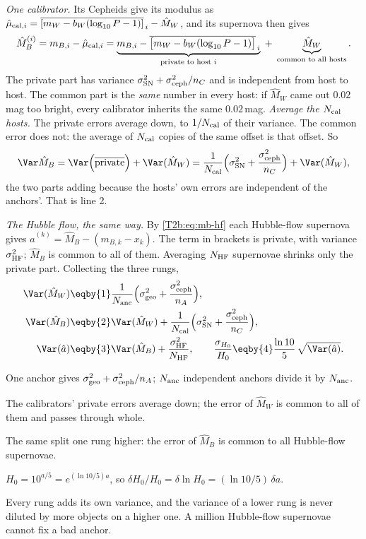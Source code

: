 \emph{One calibrator.} Its Cepheids give its modulus as $\hat\mu_{{\rm cal},i}=\overline{[m_W-b_W(\log_{10}P-1)]}_{\,i}-\hat M_W$, and its supernova then gives
\[
  \hat M_B^{(i)}=m_{B,i}-\hat\mu_{{\rm cal},i}
  =\underbrace{m_{B,i}-\overline{\big[m_W-b_W(\log_{10}P-1)\big]}_{\,i}}_{\text{private to host }i}
  \;+\;\underbrace{\hat M_W}_{\text{common to all hosts}} .
\]
The private part has variance $\sigma_{\rm SN}^2+\sigma_{\rm ceph}^2/n_C$ and is independent from host to host. The common part is the \emph{same} number in every host: if $\hat M_W$ came out $0.02$\,mag too bright, every calibrator inherits the same $0.02$\,mag. \emph{Average the $N_{\rm cal}$ hosts.} The private errors average down, to $1/N_{\rm cal}$ of their variance. The common error does not: the average of $N_{\rm cal}$ copies of the same offset is that offset. So
\[
  \Var\hat M_B=\Var\Big(\overline{\text{private}}\Big)+\Var(\hat M_W)
  =\frac{1}{N_{\rm cal}}\Big(\sigma_{\rm SN}^2+\frac{\sigma_{\rm ceph}^2}{n_C}\Big)+\Var(\hat M_W),
\]
the two parts adding because the hosts' own errors are independent of the anchors'. That is line 2.

\emph{The Hubble flow, the same way.} By \eqref{T2b:eq:mb-hf} each Hubble-flow supernova gives $\hat a^{(k)}=\hat M_B-(m_{B,k}-x_k)$. The term in brackets is private, with variance $\sigma_{\rm HF}^2$; $\hat M_B$ is common to all of them. Averaging $N_{\rm HF}$ supernovae shrinks only the private part. Collecting the three rungs,
\begin{align}
  \Var(\hat M_W)&\eqby{1}\frac{1}{N_{\rm anc}}\Big(\sigma_{\rm geo}^2+\frac{\sigma_{\rm ceph}^2}{n_A}\Big),\nonumber\\
  \Var(\hat M_B)&\eqby{2}\Var(\hat M_W)+\frac{1}{N_{\rm cal}}\Big(\sigma_{\rm SN}^2+\frac{\sigma_{\rm ceph}^2}{n_C}\Big),\nonumber\\
  \Var(\hat a)&\eqby{3}\Var(\hat M_B)+\frac{\sigma_{\rm HF}^2}{N_{\rm HF}},\qquad
  \frac{\sigma_{H_0}}{H_0}\eqby{4}\frac{\ln10}{5}\,\sqrt{\Var(\hat a)} .
  \label{T2b:eq:ladder-budget}
\end{align}
\begin{explain}
  \item One anchor gives $\sigma_{\rm geo}^2+\sigma_{\rm ceph}^2/n_A$; $N_{\rm anc}$ independent anchors divide it by $N_{\rm anc}$.
  \item The calibrators' private errors average down; the error of $\hat M_W$ is common to all of them and passes through whole.
  \item The same split one rung higher: the error of $\hat M_B$ is common to all Hubble-flow supernovae.
  \item $H_0=10^{a/5}=e^{(\ln10/5)a}$, so $\delta H_0/H_0=\delta\ln H_0=(\ln10/5)\,\delta a$.
\end{explain}
Every rung adds its own variance, and the variance of a lower rung is never diluted by more objects on a higher one. A million Hubble-flow supernovae cannot fix a bad anchor.

